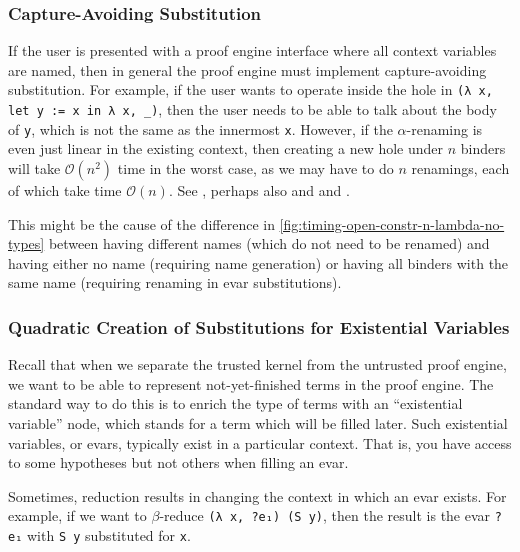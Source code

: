 
\subsubsection{Capture-Avoiding Substitution} \label{sec:perf:capture-avoiding-subst}
If the user is presented with a proof engine interface where all context variables are named, then in general the proof engine must implement capture-avoiding substitution.
For example, if the user wants to operate inside the hole in \texttt{(λ x, let y := x in λ x, _)}, then the user needs to be able to talk about the body of \texttt{y}, which is not the same as the innermost \texttt{x}.
However, if the $\alpha$-renaming is even just linear in the existing context, then creating a new hole under $n$ binders will take $\mathcal{O}(n^2)$ time in the worst case, as we may have to do $n$ renamings, each of which take time $\mathcal O(n)$.
See , perhaps also  and  and .

This might be the cause of the difference in \autoref{fig:timing-open-constr-n-lambda-no-types} between having different names (which do not need to be renamed) and having either no name (requiring name generation) or having all binders with the same name (requiring renaming in evar substitutions).


\subsubsection{Quadratic Creation of Substitutions for Existential Variables} \label{sec:perf:quadratic-evar-subst}
Recall  that when we separate the trusted kernel from the untrusted proof engine, we want to be able to represent not-yet-finished terms in the proof engine.
The standard way to do this is to enrich the type of terms with an ``existential variable'' node, which stands for a term which will be filled later.
Such existential variables, or evars, typically exist in a particular context.
That is, you have access to some hypotheses but not others when filling an evar.

Sometimes, reduction results in changing the context in which an evar exists.
For example, if we want to $\beta$-reduce \texttt{(λ x, ?e₁) (S y)}, then the result is the evar \texttt{?e₁} with \texttt{S y} substituted for \texttt{x}.


